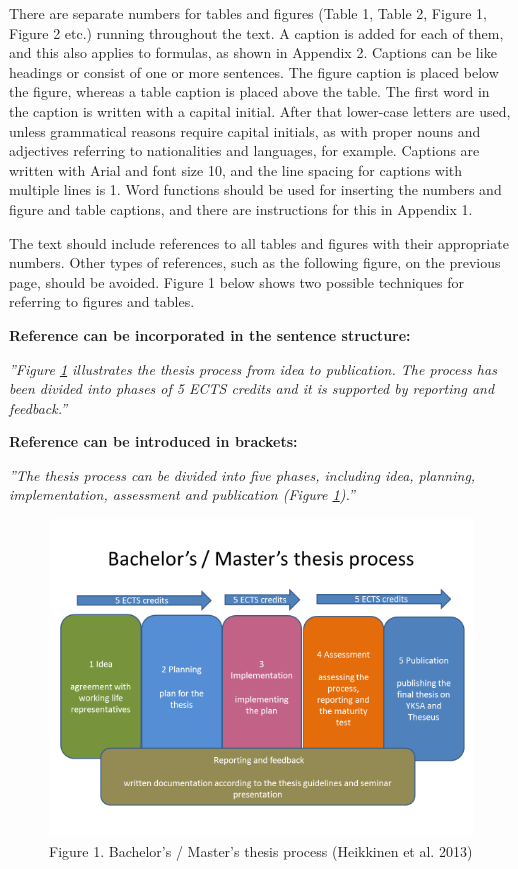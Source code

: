 \documentclass[12pt]{article}
\begin{document}
There are separate numbers for tables and figures (Table 1, Table 2, Figure 1, Figure 2 etc.) running throughout the text. A caption is added for each of them, and this also applies to formulas, as shown in Appendix 2. Captions can be like headings or consist of one or more sentences. The figure caption is placed below the figure, whereas a table caption is placed above the table. The first word in the caption is written with a capital initial. After that lower-case letters are used, unless grammatical reasons require capital initials, as with proper nouns and adjectives referring to nationalities and languages, for example. Captions are written with Arial and font size 10, and the line spacing for captions with multiple lines is 1. Word functions should be used for inserting the numbers and figure and table captions, and there are instructions for this in Appendix 1.

The text should include references to all tables and figures with their appropriate numbers. Other types of references, such as the following figure, on the previous page, should be avoided. Figure 1 below shows two possible techniques for referring to figures and tables.

\textbf{Reference can be incorporated in the sentence structure:}

\textit{”Figure \ref{bacpic} illustrates the thesis process from idea to publication. The process has been divided into phases of 5 ECTS credits and it is supported by reporting and feedback.”}

\textbf{Reference can be introduced in brackets:}

\textit{”The thesis process can be divided into five phases, including idea, planning, implementation, assessment and publication (Figure \ref{bacpic}).”}

\begin{figure}
	\includegraphics{Figure1.png}
	\caption{Figure 1. Bachelor’s / Master’s thesis process (Heikkinen et al. 2013)\label{bacpic}}
\end{figure}
\end{document}
